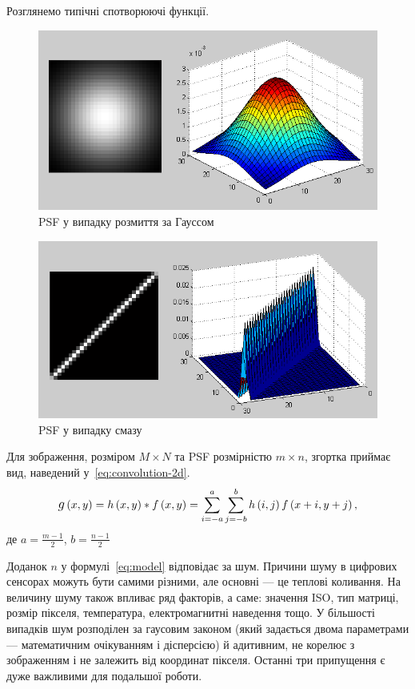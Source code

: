 \documentclass[simple,14pt,utf8,ukrainian]{eskdtext}
\begin{document}
Розглянемо типічні спотворюючі функції.
\begin{figure}[ht]
  \centering
  \includegraphics[width=\linewidth]{gaussian-blur.png}
  \caption{PSF у випадку розмиття за Гауссом}
  \label{fig:gaussian-blur}
\end{figure}
\begin{figure}[ht]
  \centering
  \includegraphics[width=\linewidth]{motion-blur.png}
  \caption{PSF у випадку смазу}
  \label{fig:motion-blur}
\end{figure}

Для зображення, розміром $M \times N$ та PSF розмірністю $m \times n$, згортка
приймає вид, наведений у~\eqref{eq:convolution-2d}.
\begin{equation}
  \mathlarger
  g\left( x, y \right) = h\left( x, y \right) \ast f\left( x, y \right) =
  \sum_{i=-a}^a \sum_{j = -b}^b h\left( i, j \right) f\left( x + i, y + j
  \right),
  \label{eq:convolution-2d}
\end{equation}
де $a = \frac{m - 1}{2}$, $b = \frac{n - 1}{2}$

Доданок $n$ у формулі~\eqref{eq:model} відповідає за шум.
Причини шуму в цифрових сенсорах можуть бути самими різними, але основні ---
це теплові коливання.
На величину шуму також впливає ряд факторів, а саме: значення ISO, тип
матриці, розмір пікселя, температура, електромагнитні наведення тощо.
У більшості випадків шум розподілен за гаусовим законом (який задається двома
параметрами --- математичним очікуванням і дісперсією) й адитивним, не корелює
з зображенням і не залежить від координат пікселя.
Останні три припущення є дуже важливими для подальшої роботи.
\end{document}
